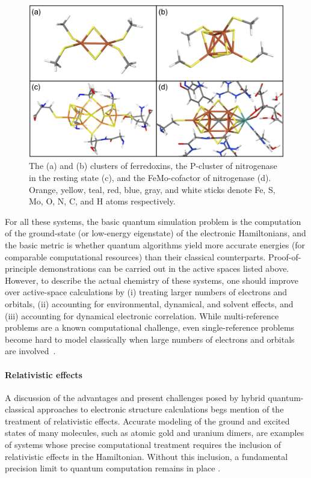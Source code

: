 \begin{figure}
\includegraphics[width=\columnwidth]{groups/2._Use_case_discovery/fes.png}
\caption{The  (a) and  (b) clusters of ferredoxins, the P-cluster of nitrogenase in the resting state  (c), and the FeMo-cofactor of nitrogenase (d). Orange, yellow, teal, red, blue, gray, and white sticks denote Fe, S, Mo, O, N, C, and H atoms respectively.}
\label{fig:fes}
\end{figure}

For all these systems, the basic quantum simulation problem is the computation of the ground-state (or low-energy eigenstate) of the electronic Hamiltonians, 
and the basic metric is whether quantum algorithms yield more accurate energies (for comparable computational resources) than their classical counterparts.
Proof-of-principle demonstrations can be carried out in the active spaces listed above.
However, to describe the actual chemistry of these systems, one should improve over active-space calculations by (i) treating larger numbers of electrons and orbitals, 
(ii) accounting for environmental, dynamical, and solvent effects, and (iii) accounting for dynamical electronic correlation.  While multi-reference problems are a known computational challenge,
even single-reference problems become hard to model classically when large numbers of electrons and orbitals are involved~\cite{vandevondele2012linear}.

\paragraph{Relativistic effects}

A discussion of the advantages and present challenges posed by hybrid quantum-classical approaches to electronic structure calculations begs mention of the treatment of relativistic effects.  
Accurate modeling of the ground and excited states of many molecules, such as atomic gold and uranium dimers, are examples of systems whose precise computational treatment requires the inclusion of relativistic effects in the Hamiltonian.  
Without this inclusion, a fundamental precision limit to quantum computation remains in place \cite{stetina2022simulating}.

